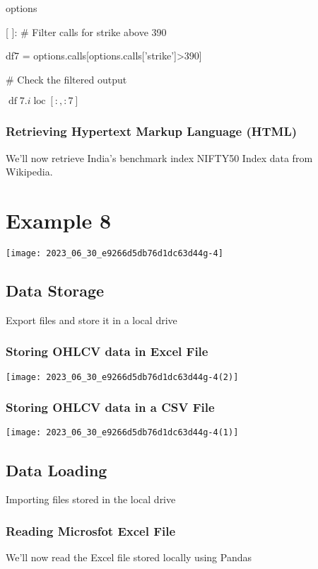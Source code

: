 \documentclass[10pt]{article}
\begin{document}
options

[ ]: \# Filter calls for strike above 390

df7 = options.calls[options.calls['strike']>390]

\# Check the filtered output

$\operatorname{df} 7 . i \operatorname{loc}[:,: 7]$

\subsubsection*{Retrieving Hypertext Markup Language (HTML)}
We'll now retrieve India's benchmark index NIFTY50 Index data from Wikipedia.

\section*{Example 8}
\begin{center}
\texttt{[image: 2023\_06\_30\_e9266d5db76d1dc63d44g-4]}
\end{center}

\subsection*{Data Storage}
Export files and store it in a local drive

\subsubsection*{Storing OHLCV data in Excel File}
\begin{center}
\texttt{[image: 2023\_06\_30\_e9266d5db76d1dc63d44g-4(2)]}
\end{center}

\subsubsection*{Storing OHLCV data in a CSV File}
\begin{center}
\texttt{[image: 2023\_06\_30\_e9266d5db76d1dc63d44g-4(1)]}
\end{center}

\subsection*{Data Loading}
Importing files stored in the local drive

\subsubsection*{Reading Microsfot Excel File}
We'll now read the Excel file stored locally using Pandas
\end{document}
